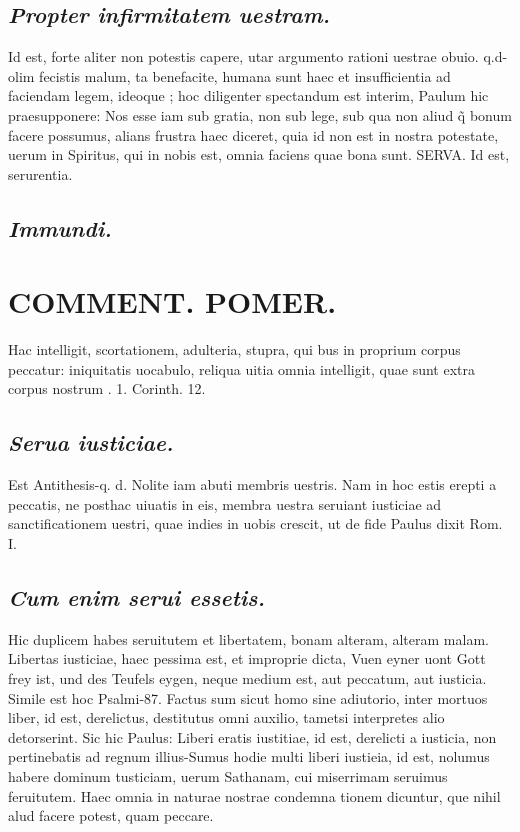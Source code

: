 \documentclass{article}
\begin{document}
\begin{pages}
\subsection*{\textit{Propter infirmitatem uestram. }}\pstart Id est, forte aliter non potestis capere, utar argumento rationi uestrae obuio. q.d-olim fecistis malum, ta benefacite, humana sunt haec et insufficientia ad faciendam legem, ideoque ; hoc diligenter spectandum est interim, Paulum hic praesupponere: Nos esse iam sub gratia, non sub lege, sub qua non aliud q̃ bonum facere possumus, alians frustra haec diceret, quia id non est in nostra potestate, uerum in Spiritus, qui in nobis est, omnia faciens quae bona sunt. SERVA. Id est, serurentia.   \pend
{}
{}
\subsection*{\textit{Immundi. }}
{}
\subsection*{\textit{}}
\section*{COMMENT. POMER.  }\pstart Hac intelligit, scortationem, adulteria, stupra, qui bus in proprium corpus peccatur: iniquitatis uocabulo, reliqua uitia omnia intelligit, quae sunt extra corpus nostrum . 1. Corinth. 12.   \pend
{}
{}
\subsection*{\textit{Serua iusticiae. }}\pstart Est Antithesis-q. d. Nolite iam abuti membris uestris. Nam in hoc estis erepti a peccatis, ne posthac uiuatis in eis, membra uestra seruiant iusticiae ad sanctificationem uestri, quae indies in uobis crescit, ut de fide Paulus dixit Rom. I.   \pend
{}
{}
\subsection*{\textit{Cum enim serui essetis. }}\pstart Hic duplicem habes seruitutem et libertatem, bonam alteram, alteram malam. Libertas iusticiae, haec pessima est, et improprie dicta, Vuen eyner uont Gott frey ist, und des Teufels eygen, neque medium est, aut peccatum, aut iusticia. Simile est hoc Psalmi-87. Factus sum sicut homo sine adiutorio, inter mortuos liber, id est, derelictus, destitutus omni auxilio, tametsi interpretes alio detorserint. Sic hic Paulus: Liberi eratis iustitiae, id est, derelicti a iusticia, non pertinebatis ad regnum illius-Sumus hodie multi liberi iustieia, id est, nolumus habere dominum tusticiam, uerum Sathanam, cui miserrimam seruimus feruitutem. Haec omnia in naturae nostrae condemna tionem dicuntur, que nihil alud facere potest, quam peccare.   \pend

\end{pages}
\end{document}
